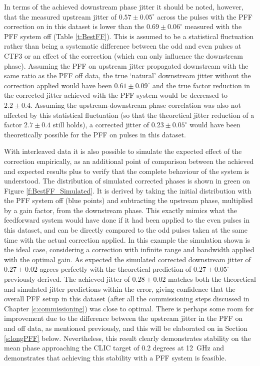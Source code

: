 In terms of the achieved downstream phase jitter it should be noted, however, that the 
measured upstream jitter of \(0.57\pm0.05^\circ\) across the pulses with the PFF 
correction on in this dataset is lower than the \(0.69\pm0.06^\circ\) measured with the 
PFF system off (Table \ref{t:BestFF}). This is assumed to be a statistical fluctuation 
rather than being a systematic difference between the odd and even pulses at CTF3 or an 
effect of the correction (which can only influence the downstream phase). Assuming the 
PFF on upstream jitter propagated downstream with the same ratio as the PFF off data, 
the true `natural' downstream jitter without the correction applied would have been 
\(0.61\pm0.09^\circ\) and the true factor reduction in the corrected jitter achieved 
with the PFF system would be decreased to \(2.2\pm0.4\). Assuming the 
upstream-downstream phase correlation was also not affected by this statistical 
fluctuation (so that the theoretical jitter reduction of a factor \(2.7\pm0.4\) still 
holds), a corrected jitter of \(0.23\pm0.05^\circ\) would have been theoretically 
possible for the PFF on pulses in this dataset. 


With interleaved data it is also possible to simulate the expected effect of the 
correction empirically, as an additional point of comparison between the achieved and 
expected results plus to verify that the complete behaviour of the system is understood. The distribution of simulated corrected phases is shown in green on Figure 
\ref{f:BestFF_Simulated}. It is derived by taking the initial distribution with the PFF 
system off (blue points) and subtracting the upstream phase, multiplied by a gain 
factor, from the downstream phase. This exactly mimics what the feedforward system would have done if it had been applied to the even pulses in this dataset, and can be directly compared to the odd pulses taken at the same time with the actual correction applied. In this example the simulation shown is the ideal case, considering a correction with 
infinite range and bandwidth applied with the optimal gain. As expected the simulated 
corrected downstream jitter of \(0.27\pm0.02\) agrees perfectly with the theoretical 
prediction of \(0.27\pm0.05^\circ\) previously derived. The achieved jitter of 
\(0.28\pm0.02\) matches both the theoretical and simulated jitter predictions within the error, giving confidence that the overall PFF setup in this dataset (after all the 
commissioning steps discussed in Chapter \ref{c:commissioning}) was close to optimal. 
There is perhaps some room for improvement due to the difference between the upstream 
jitter in the PFF on and off data, as mentioned previously, and this will be elaborated 
on in Section \ref{s:longPFF} below. Nevertheless, this result clearly demonstrates 
stability on the mean phase approaching the CLIC target of 0.2 degrees at 12~GHz and 
demonstrates that achieving this stability with a PFF system is feasible.



